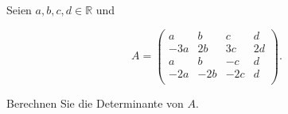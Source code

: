 \newpage

\subsubsection{}%

Seien \( a, b, c, d \in \mathbb{R} \) und

\begin{equation*}
    A = \begin{pmatrix}
    a & b & c & d \\
    -3a & 2b & 3c & 2d \\
    a & b & -c & d \\
    -2a & -2b & -2c & d \\
    \end{pmatrix}.
\end{equation*}

Berechnen Sie die Determinante von \( A \). 

\vspace{1\baselineskip}

